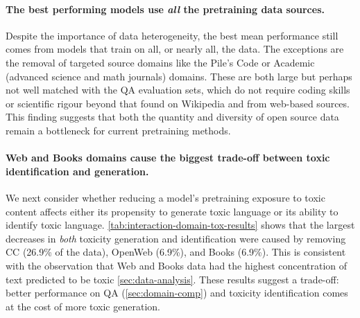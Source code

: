 \documentclass{article}
\begin{document}
\vspace{-3mm}
\paragraph{The best performing models use \emph{all} the pretraining data sources.}
Despite the importance of data heterogeneity, the best mean performance still comes from models that train on all, or nearly all, the data.
The exceptions are the removal of targeted source domains like the Pile's Code or Academic (advanced science and math journals) domains. These are both large but perhaps not well matched with the QA evaluation sets, which do not require coding skills or scientific rigour beyond that found on Wikipedia and from web-based sources.
This finding suggests that both the quantity and diversity of open source data remain a bottleneck for current pretraining methods. 

\vspace{-3mm}
\paragraph{Web and Books domains cause the biggest trade-off between toxic identification and generation.}
\label{sec:interaction-domain-toxqual}
We next consider whether reducing a model's pretraining exposure to toxic content affects either its propensity to generate toxic language or its ability to identify toxic language.
\cref{tab:interaction-domain-tox-results} shows that the largest decreases in \textit{both} toxicity generation and identification were caused by removing CC (26.9\% of the data), OpenWeb (6.9\%), and Books (6.9\%).
This is consistent with the observation that Web and Books data had the highest concentration of text predicted to be toxic \cref{sec:data-analysis}.
These results suggest a trade-off: better performance on QA (\cref{sec:domain-comp}) and toxicity identification comes at the cost of more toxic generation.
\end{document}
